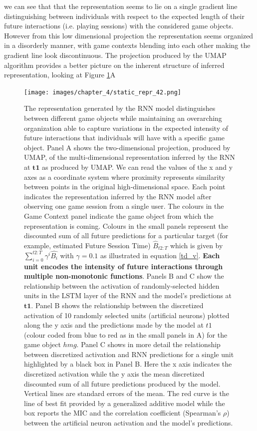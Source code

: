 we can see that that the representation seems to lie on a single gradient line distinguishing between individuals with respect to the expected length of their future interactions (i.e. playing sessions) with the considered game objects. However from this low dimensional projection the representation seems organized in a disorderly manner, with game contexts blending into each other making the gradient line look discontinuous. The projection produced by the UMAP algorithm provides a better picture on the inherent structure of inferred representation, looking at Figure \ref{full_panel_static}A 
\begin{figure}[ht]
\centering
\texttt{[image: images/chapter\_4/static\_repr\_42.png]}
\caption[\textbf{Lower dimensional representation of the latent state generated by the RNN architecture}]{The representation generated by the RNN model distinguishes between different game objects while maintaining an overarching organization able to capture variations in the expected intensity of future interactions that individuals will have with a specific game object. Panel A shows the two-dimensional projection, produced by UMAP, of the multi-dimensional representation inferred by the RNN at $\mathbf{t1}$ as produced by UMAP. We can read the values of the x and y axes as a coordinate system where proximity represents similarity between points in the original high-dimensional space. Each point indicates the representation inferred by the RNN model after observing one game session from a single user. The colours in the Game Context panel indicate the game object from which the representation is coming. Colours in the small panels represent the discounted sum of all future predictions for a particular target (for example, estimated Future Session Time) $\widehat{B}_{t2:T}$ which is given by $\sum_{i=0}^{t2:T} \gamma^i\widehat{B_i}$ with $\gamma=0.1$ as illustrated in equation \ref{td_v}. \textbf{Each unit  encodes the intensity of future interactions through multiple non-monotonic functions}. Panels B and C show the relationship between the activation of randomly-selected hidden units in the LSTM layer of the RNN and the model's predictions at $\mathbf{t1}$. Panel B shows the relationship between the discretized activation of 10 randomly selected units (artificial neurons) plotted along the y axis and the predictions made by the model at $t1$ (colour coded from blue to red as in the small panels in A) for the game object $hmg$. Panel C shows in more detail the relationship between discretized activation and RNN predictions for a single unit highlighted by a black box in Panel B. Here the x axis indicates the discretized activation while the y axis the mean discretized discounted sum of all future predictions produced by the model. Vertical lines are standard errors of the mean. The red curve is the line of best fit provided by a generalized additive model \cite{serven2018} while the box reports the MIC and the correlation coefficient (Spearman's $\rho$) between the artificial neuron activation and the model's predictions.}
\label{full_panel_static}
\end{figure}

